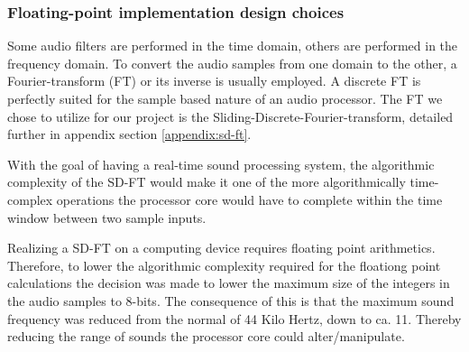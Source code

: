 \subsubsection{Floating-point implementation design choices}

Some audio filters are performed in the time domain, others are performed in the
frequency domain. To convert the audio samples from one domain to the other, a
Fourier-transform (FT) or its inverse is usually employed. A discrete FT is
perfectly suited for the sample based nature of an audio processor. The FT we
chose to utilize for our project is the
Sliding-Discrete-Fourier-transform, detailed further in appendix section
\ref{appendix:sd-ft}.

With the goal of having a real-time sound processing system, the algorithmic
complexity of the SD-FT would make it one of the more algorithmically
time-complex operations the processor core would have to complete within the
time window between two sample inputs.

Realizing a SD-FT on a computing device requires floating point arithmetics.
Therefore, to lower the algorithmic complexity required for the floationg point
calculations the decision was made to lower the maximum size of the integers in
the audio samples to 8-bits. The consequence of this is that the maximum sound
frequency was reduced from the normal of 44 Kilo Hertz, down to ca. 11. Thereby
reducing the range of sounds the processor core could alter/manipulate.
